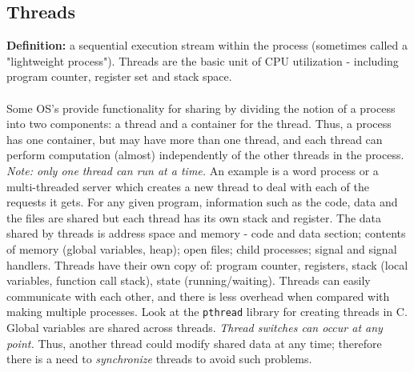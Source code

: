 \documentclass[twoside]{article}
\begin{document}
\subsection{Threads}
\textbf{Definition:} a sequential execution stream within the process (sometimes called a "lightweight process"). Threads are the basic unit of CPU utilization - including program counter, register set and stack space.\\ \\
Some OS's provide functionality for sharing by dividing the notion of a process into two components: a thread and a container for the thread. Thus, a process has one container, but may have more than one thread, and each thread can perform computation (almost) independently of the other threads in the process. \emph{Note: only one thread can run at a time.} An example is a word process or a multi-threaded server which creates a new thread to deal with each of the requests it gets. For any given program, information such as the code, data and the files are shared but each thread has its own stack and register. The data shared by threads is address space and memory - code and data section; contents of memory (global variables, heap); open files; child processes; signal and signal handlers. Threads have their own copy of: program counter, registers, stack (local variables, function call stack), state (running/waiting). Threads can easily communicate with each other, and there is less overhead when compared with making multiple processes. Look at the \texttt{pthread} library for creating threads in C. Global variables are shared across threads. \emph{Thread switches can occur at any point.} Thus, another thread could modify shared data at any time; therefore there is a need to \emph{synchronize} threads to avoid such problems.
\end{document}
